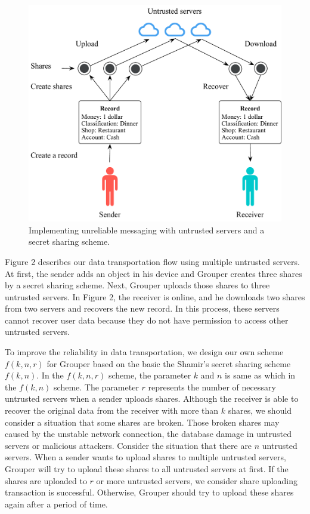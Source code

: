 \documentclass[twocolumn,10pt]{article}
\begin{document}
\begin{figure}[t]
	\centering
	\includegraphics[scale=0.42]{sync_flow}
	\caption{Implementing unreliable messaging with untrusted servers and a secret sharing scheme.}
\end{figure}

Figure 2 describes our data transportation flow using multiple untrusted servers. 
At first, the sender adds an object in his device and Grouper creates three shares by a secret sharing scheme. 
Next, Grouper uploads those shares to three untrusted servers. 
In Figure 2, the receiver is online, and he downloads two shares from two servers and recovers the new record. 
In this process, these servers cannot recover user data because they do not have permission to access other untrusted servers. 

To improve the reliability in data transportation, we design our own scheme $f(k, n, r)$ for Grouper based on the basic the Shamir's secret sharing scheme $f(k, n)$.
In the $f(k, n, r)$ scheme, the parameter $k$ and $n$ is same as which in the  $f(k, n)$ scheme. 
The parameter $r$ represents the number of necessary untrusted servers when a sender uploads shares.
Although the receiver is able to recover the original data from the receiver with more than $k$ shares, we should consider a situation that some shares are broken.
Those broken shares may caused by the unstable network connection, the database damage in untrusted servers or malicious attackers.
Consider the situation that there are $n$ untrusted servers. 
When a sender wants to upload shares to multiple untrusted servers, Grouper will try to upload these shares to all untrusted servers at first.
If the shares are uploaded to $r$ or more untrusted servers, we consider share uploading transaction is successful.
Otherwise, Grouper should try to upload these shares again after a period of time.
\end{document}
